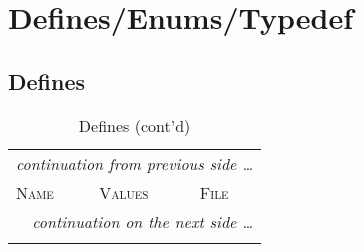 \section{Defines/Enums/Typedef}

\subsection{Defines}
\begin{tiny}
\begin{longtable}[ht]{|p{0.45\tablwidth}|p{0.15\tablwidth}|p{0.3\tablwidth}|}
  \caption[Defines]{Defines}
  \label{table_(defines_enums_typedef):defines} \\
  \hline
  \endfirsthead
  \caption[Defines (cont'd)]{Defines (cont'd)} \\
  \hline
  \multicolumn{3}{l}{\textsl{continuation from previous side \ldots}} \\
  \hline \cellcolor{tablefirstrowcolor} \textsc{Name} & \cellcolor{tablefirstrowcolor} \textsc{Values} & \cellcolor{tablefirstrowcolor} \textsc{File} \\
  \hline
  \endhead
  \hline
  \multicolumn{3}{r}{\textsl{continuation on the next side \ldots}} \\
  \hline
  \endfoot
  \hline
  \endlastfoot


\end{longtable}
\end{tiny}

